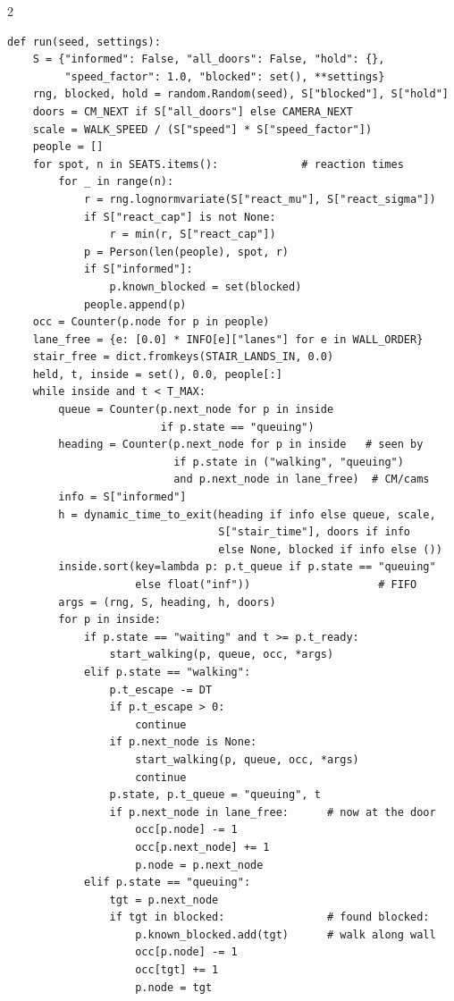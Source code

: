 \documentclass[10pt]{article}
\begin{document}
\begin{multicols*}{2}
\begin{lstlisting}
def run(seed, settings):
    S = {"informed": False, "all_doors": False, "hold": {},
         "speed_factor": 1.0, "blocked": set(), **settings}
    rng, blocked, hold = random.Random(seed), S["blocked"], S["hold"]
    doors = CM_NEXT if S["all_doors"] else CAMERA_NEXT
    scale = WALK_SPEED / (S["speed"] * S["speed_factor"])
    people = []
    for spot, n in SEATS.items():             # reaction times
        for _ in range(n):
            r = rng.lognormvariate(S["react_mu"], S["react_sigma"])
            if S["react_cap"] is not None:
                r = min(r, S["react_cap"])
            p = Person(len(people), spot, r)
            if S["informed"]:
                p.known_blocked = set(blocked)
            people.append(p)
    occ = Counter(p.node for p in people)
    lane_free = {e: [0.0] * INFO[e]["lanes"] for e in WALL_ORDER}
    stair_free = dict.fromkeys(STAIR_LANDS_IN, 0.0)
    held, t, inside = set(), 0.0, people[:]
    while inside and t < T_MAX:
        queue = Counter(p.next_node for p in inside
                        if p.state == "queuing")
        heading = Counter(p.next_node for p in inside   # seen by
                          if p.state in ("walking", "queuing")
                          and p.next_node in lane_free)  # CM/cams
        info = S["informed"]
        h = dynamic_time_to_exit(heading if info else queue, scale,
                                 S["stair_time"], doors if info
                                 else None, blocked if info else ())
        inside.sort(key=lambda p: p.t_queue if p.state == "queuing"
                    else float("inf"))                    # FIFO
        args = (rng, S, heading, h, doors)
        for p in inside:
            if p.state == "waiting" and t >= p.t_ready:
                start_walking(p, queue, occ, *args)
            elif p.state == "walking":
                p.t_escape -= DT
                if p.t_escape > 0:
                    continue
                if p.next_node is None:
                    start_walking(p, queue, occ, *args)
                    continue
                p.state, p.t_queue = "queuing", t
                if p.next_node in lane_free:      # now at the door
                    occ[p.node] -= 1
                    occ[p.next_node] += 1
                    p.node = p.next_node
            elif p.state == "queuing":
                tgt = p.next_node
                if tgt in blocked:                # found blocked:
                    p.known_blocked.add(tgt)      # walk along wall
                    occ[p.node] -= 1
                    occ[tgt] += 1
                    p.node = tgt

\end{lstlisting}
\end{multicols*}
\end{document}
